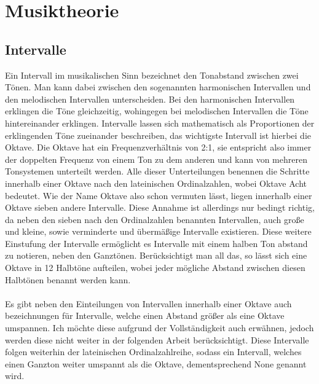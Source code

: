 \section{Musiktheorie}
\subsection*{Intervalle}
\label{sec:Intervalle}
Ein Intervall im musikalischen Sinn bezeichnet den Tonabstand zwischen zwei Tönen. Man kann dabei zwischen den sogenannten harmonischen Intervallen und den melodischen Intervallen unterscheiden. Bei den harmonischen Intervallen erklingen die Töne
gleichzeitig, wohingegen bei melodischen Intervallen die Töne hintereinander erklingen. Intervalle lassen sich mathematisch als Proportionen der erklingenden Töne zueinander beschreiben, das wichtigste Intervall ist hierbei die Oktave. Die Oktave hat ein Frequenzverhältnis von 2:1, 
sie entspricht also immer der doppelten Frequenz von einem Ton zu dem anderen und kann von mehreren Tonsystemen unterteilt werden. Alle dieser Unterteilungen benennen die Schritte innerhalb einer 
Oktave nach den lateinischen Ordinalzahlen, wobei Oktave Acht bedeutet. Wie der Name Oktave also schon vermuten lässt, liegen innerhalb einer Oktave sieben andere Intervalle. Diese Annahme ist allerdings nur bedingt richtig, da neben den sieben nach den Ordinalzahlen benannten Intervallen, auch 
große und kleine, sowie verminderte und übermäßige Intervalle existieren. Diese weitere Einstufung der Intervalle ermöglicht es Intervalle mit einem halben Ton abstand zu notieren, neben den Ganztönen. Berücksichtigt man all das, so lässt sich eine Oktave in 
12 Halbtöne aufteilen, wobei jeder mögliche Abstand zwischen diesen Halbtönen benannt werden kann. \\\\
Es gibt neben den Einteilungen von Intervallen innerhalb einer Oktave auch bezeichnungen für Intervalle, welche einen Abstand größer als eine Oktave umspannen. Ich möchte diese aufgrund der Vollständigkeit auch erwähnen, jedoch werden diese nicht weiter in der folgenden Arbeit berücksichtigt.
Diese Intervalle folgen weiterhin der lateinischen Ordinalzahlreihe, sodass ein Intervall, welches einen Ganzton weiter umspannt als die Oktave, dementsprechend None genannt wird. \cite{abcmusik}

